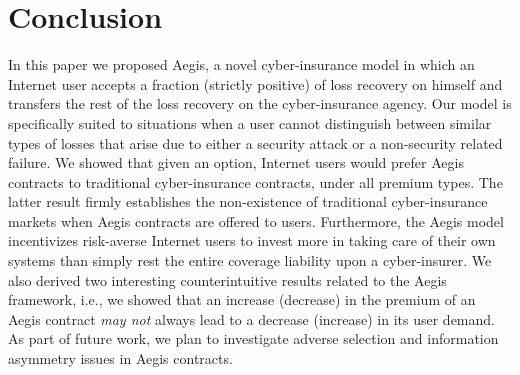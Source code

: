 \documentclass[letterpaper,12pt, onecolumn, nodraft]{IEEEtran}
\begin{document}
\section{Conclusion} \label{sec-conslusion}
In this paper we proposed Aegis, a novel cyber-insurance model in which an Internet user accepts a fraction (strictly positive) of loss recovery on himself and transfers the rest of the loss recovery on the cyber-insurance agency. Our model is specifically suited to situations when a user  cannot distinguish between similar types of losses that arise due to either a security attack or a non-security related failure. We showed that given an option, Internet users would prefer Aegis contracts to traditional cyber-insurance contracts, under all premium types. The latter result firmly establishes the non-existence of traditional cyber-insurance markets when Aegis contracts are offered to users. Furthermore, the Aegis model incentivizes risk-averse Internet users to invest more in taking care of their own systems than simply rest the entire coverage liability upon a cyber-insurer. We also derived two interesting counterintuitive results related to the Aegis framework, i.e., we showed that an increase (decrease) in the premium of an Aegis contract \emph{may not} always lead to a decrease (increase) in its user demand. As part of future work, we plan to investigate adverse selection and information asymmetry issues in Aegis contracts. 

\newpage


\end{document}
